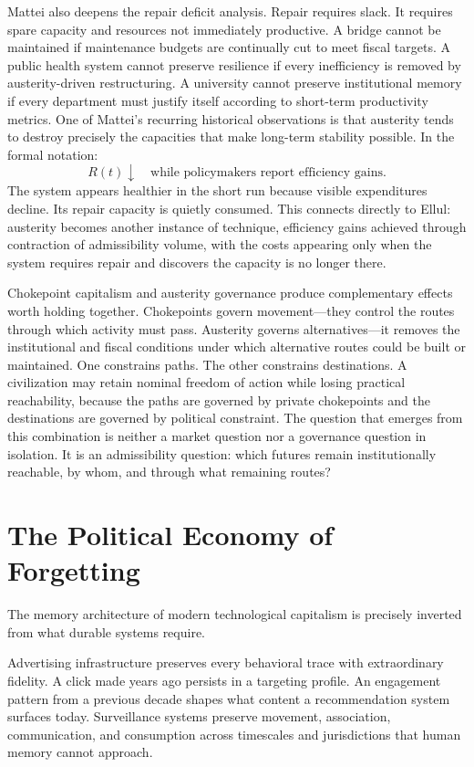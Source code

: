 \documentclass[11pt, letterpaper]{article}
\begin{document}
Mattei also deepens the repair deficit analysis. Repair requires slack. It requires spare capacity and resources not immediately productive. A bridge cannot be maintained if maintenance budgets are continually cut to meet fiscal targets. A public health system cannot preserve resilience if every inefficiency is removed by austerity-driven restructuring. A university cannot preserve institutional memory if every department must justify itself according to short-term productivity metrics. One of Mattei's recurring historical observations is that austerity tends to destroy precisely the capacities that make long-term stability possible. In the formal notation:
\[
  R(t) \downarrow \quad \text{while policymakers report efficiency gains.}
\]
The system appears healthier in the short run because visible expenditures decline. Its repair capacity is quietly consumed. This connects directly to Ellul: austerity becomes another instance of technique, efficiency gains achieved through contraction of admissibility volume, with the costs appearing only when the system requires repair and discovers the capacity is no longer there.

Chokepoint capitalism and austerity governance produce complementary effects worth holding together. Chokepoints govern movement---they control the routes through which activity must pass. Austerity governs alternatives---it removes the institutional and fiscal conditions under which alternative routes could be built or maintained. One constrains paths. The other constrains destinations. A civilization may retain nominal freedom of action while losing practical reachability, because the paths are governed by private chokepoints and the destinations are governed by political constraint. The question that emerges from this combination is neither a market question nor a governance question in isolation. It is an admissibility question: which futures remain institutionally reachable, by whom, and through what remaining routes?

\section{The Political Economy of Forgetting}

The memory architecture of modern technological capitalism is precisely inverted from what durable systems require.

Advertising infrastructure preserves every behavioral trace with extraordinary fidelity. A click made years ago persists in a targeting profile. An engagement pattern from a previous decade shapes what content a recommendation system surfaces today. Surveillance systems preserve movement, association, communication, and consumption across timescales and jurisdictions that human memory cannot approach.
\end{document}
